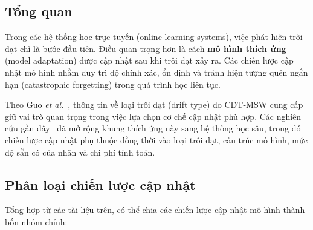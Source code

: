 \subsection{Tổng quan}
Trong các hệ thống học trực tuyến (online learning systems), việc phát hiện trôi dạt chỉ là bước đầu tiên. Điều quan trọng hơn là cách \textbf{mô hình thích ứng} (model adaptation) được cập nhật sau khi trôi dạt xảy ra. Các chiến lược cập nhật mô hình nhằm duy trì độ chính xác, ổn định và tránh hiện tượng quên ngắn hạn (catastrophic forgetting) trong quá trình học liên tục.

Theo Guo \textit{et al.}~\cite{guo2022cdtmsw}, thông tin về loại trôi dạt (drift type) do CDT-MSW cung cấp giữ vai trò quan trọng trong việc lựa chọn cơ chế cập nhật phù hợp. Các nghiên cứu gần đây~\cite{jourdan2023process} đã mở rộng khung thích ứng này sang hệ thống học sâu, trong đó chiến lược cập nhật phụ thuộc đồng thời vào loại trôi dạt, cấu trúc mô hình, mức độ sẵn có của nhãn và chi phí tính toán.

\subsection{Phân loại chiến lược cập nhật}
Tổng hợp từ các tài liệu trên, có thể chia các chiến lược cập nhật mô hình thành bốn nhóm chính:

